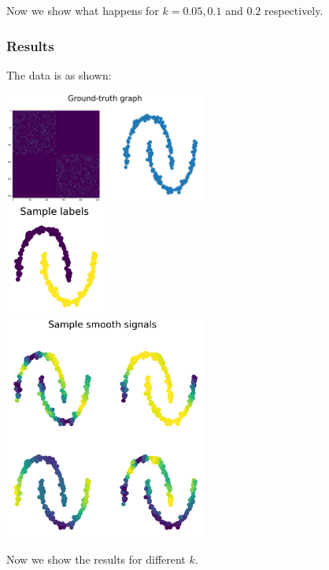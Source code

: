 \documentclass[a4paper]{article}
\newcommand{\nl}{\vspace{0.2cm}\\}
\begin{document}
Now we show what happens for $k = 0.05, 0.1$ and $0.2$ respectively.

\subsubsection{Results}

The data is as shown:\nl
\begin{center}
    \includegraphics[width=0.5\textwidth]{images/p2/ground_truth.png}\nl
    \includegraphics[width=0.25\textwidth]{images/p2/labels.png}\nl
    \includegraphics[width=0.5\textwidth]{images/p2/signals.png}\nl
\end{center}

Now we show the results for different $k$.
\end{document}

